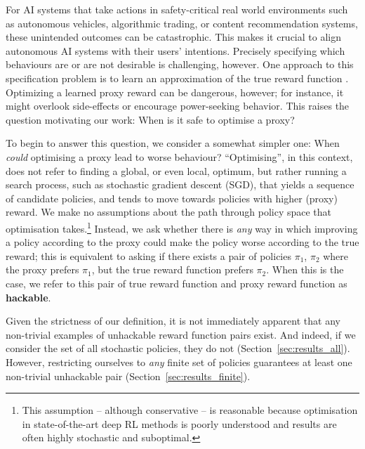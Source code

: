 \documentclass{article}
\theoremstyle{definition}
\theoremstyle{remark}
\begin{document}
For AI systems that take actions in safety-critical real world environments such as autonomous vehicles,
algorithmic trading,
or content recommendation systems, %
these unintended outcomes can be catastrophic.
This makes it crucial to align autonomous AI systems with their users' intentions.
Precisely specifying which behaviours are or are not desirable is challenging, however.
One approach to this specification problem is to learn an approximation of the true reward function \citep{ng2000algorithms, ziebart2010modeling, leike2018scalable}.
Optimizing a learned proxy reward can be dangerous, however;
for instance, it might overlook side-effects \citep{Krakovna2018Penalizing, Turner2019Conservative} or encourage power-seeking \citep{turner2021optimalneurips} behavior.
This raises the question motivating our work: When is it safe to optimise a proxy? 

To begin to answer this question, we consider a somewhat simpler one: When \textit{could} optimising a proxy lead to worse behaviour? 
\enquote{Optimising}, in this context, does not refer to finding a global, or even local, optimum, but rather running a search process, such as stochastic gradient descent (SGD), that yields a sequence of candidate policies, and tends to move towards policies with higher (proxy) reward. 
We make no assumptions about the path through policy space that optimisation takes.\footnote{
 This assumption -- although conservative -- is reasonable because optimisation in state-of-the-art deep RL methods is poorly understood and results are often highly stochastic and suboptimal.
}
Instead, we ask whether there is \textit{any} way in which improving a policy according to the proxy could make the policy worse according to the true reward; this is equivalent to asking if there exists a pair of policies $\pi_1$, $\pi_2$ where the proxy prefers $\pi_1$, but the true reward function prefers $\pi_2$.
When this is the case, we refer to this pair of true reward function and proxy reward function as \textbf{hackable}. 




Given the strictness of our definition, it is not immediately apparent that any non-trivial examples of unhackable reward function pairs exist. 
And indeed, if we consider the set of all stochastic policies, they do not (Section~\ref{sec:results_all}).
However, restricting ourselves to \textit{any} finite set of policies guarantees at least one non-trivial unhackable pair (Section~\ref{sec:results_finite}).
\end{document}
